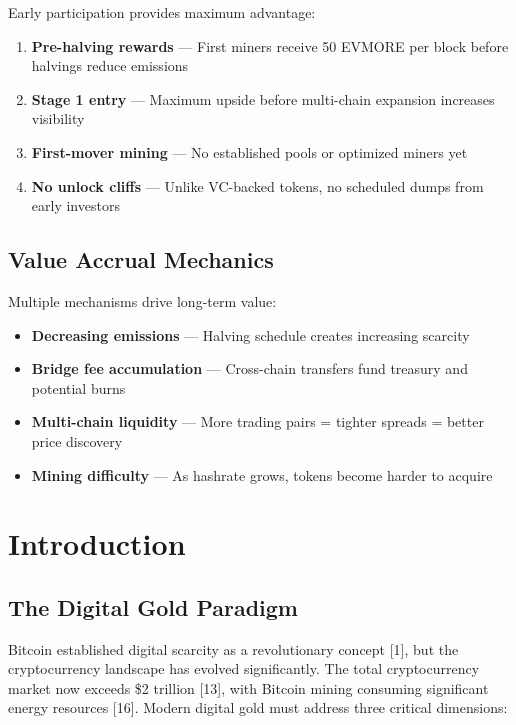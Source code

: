 \documentclass[11pt,a4paper]{article}
\begin{document}
Early participation provides maximum advantage:

\begin{enumerate}
    \item \textbf{Pre-halving rewards} --- First miners receive 50 EVMORE per block before halvings reduce emissions
    \item \textbf{Stage 1 entry} --- Maximum upside before multi-chain expansion increases visibility
    \item \textbf{First-mover mining} --- No established pools or optimized miners yet
    \item \textbf{No unlock cliffs} --- Unlike VC-backed tokens, no scheduled dumps from early investors
\end{enumerate}

\subsection{Value Accrual Mechanics}

Multiple mechanisms drive long-term value:

\begin{itemize}
    \item \textbf{Decreasing emissions} --- Halving schedule creates increasing scarcity
    \item \textbf{Bridge fee accumulation} --- Cross-chain transfers fund treasury and potential burns
    \item \textbf{Multi-chain liquidity} --- More trading pairs = tighter spreads = better price discovery
    \item \textbf{Mining difficulty} --- As hashrate grows, tokens become harder to acquire
\end{itemize}

\section{Introduction}

\subsection{The Digital Gold Paradigm}

Bitcoin established digital scarcity as a revolutionary concept [1], but the cryptocurrency landscape has evolved significantly. The total cryptocurrency market now exceeds \$2 trillion [13], with Bitcoin mining consuming significant energy resources [16]. Modern digital gold must address three critical dimensions:
\end{document}
